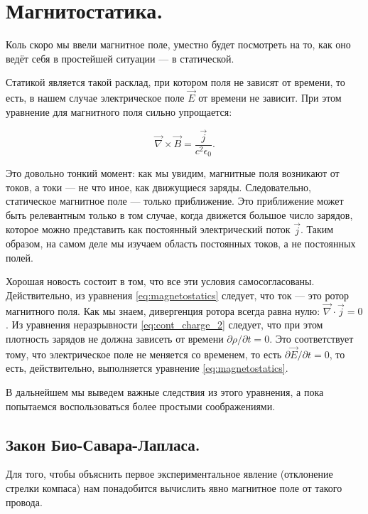 \documentclass[a4paper,12pt]{article}
\newcommand{\pt}{\partial}
\newcommand{\eps}{\epsilon}
\newcommand{\vn}{\vec{\nabla}}
\begin{document}
\section{Магнитостатика.}
\label{sec:magnetostatics}

Коль скоро мы ввели магнитное поле, уместно будет посмотреть на то,
как оно ведёт себя в простейшей ситуации — в статической. 

Статикой является такой расклад, при котором поля не зависят от
времени, то есть, в нашем случае электрическое поле $\vec{E}$ от
времени не зависит. При этом уравнение для магнитного поля сильно
упрощается: 

\begin{equation}
  \label{eq:magnetostatics}
  \vn \times \vec{B} = \frac{\vec{j}}{c^2\eps_0}.
\end{equation}

Это довольно тонкий момент: как мы увидим, магнитные поля возникают от
токов, а токи --- не что иное, как движущиеся заряды. Следовательно,
статическое магнитное поле --- только приближение. Это приближение
может быть релевантным только в том случае, когда движется большое
число зарядов, которое можно представить как постоянный электрический
поток $\vec{j}$. Таким образом, на самом деле мы изучаем область
постоянных токов, а не постоянных полей. 

Хорошая новость состоит в том, что все эти условия
самосогласованы. Действительно, из уравнения \eqref{eq:magnetostatics}
следует, что ток --- это ротор магнитного поля. Как мы знаем,
дивергенция ротора всегда равна нулю: $\vn \cdot \vec{j} =0$. Из
уравнения неразрывности \eqref{eq:cont_charge_2} следует, что при этом
плотность зарядов не должна зависеть от времени $\pt \rho / \pt t
=0$. Это соответствует тому, что электрическое поле не меняется со
временем, то есть $\pt \vec{E}/ \pt t =0$, то есть, действительно,
выполняется уравнение \eqref{eq:magnetostatics}.

В дальнейшем мы выведем важные следствия из этого уравнения, а пока
попытаемся воспользоваться более простыми соображениями. 

\subsection{Закон Био-Савара-Лапласа.}
\label{sec:biot_savart_law}

Для того, чтобы объяснить первое экспериментальное явление (отклонение
стрелки компаса) нам понадобится вычислить явно магнитное поле от
такого провода. 
\end{document}

